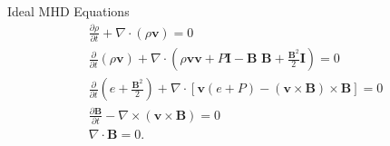 \documentclass[10pt,aspectratio=169,usenames,dvipsnames]{beamer}
\begin{document}
\begin{frame}{Ideal MHD Equations}
\footnotesize
\begin{gather}
\frac{\partial \rho}{\partial t} + \nabla \cdot (\rho \textbf{v}) = 0 \\
\frac{\partial}{\partial t} (\rho \textbf{v})+ \nabla \cdot \left( \rho \textbf{v} \textbf{v} + P \textbf{I} - \textbf{B B} + \frac{\textbf{B}^2}{2} \textbf{I} \right) = 0\\
\frac{\partial}{\partial t} \left( e + \frac{\textbf{B}^2}{2} \right) + \nabla \cdot \left[ \textbf{v} ( e + P) -  (\textbf{v} \times \textbf{B}) \times \textbf{B} \right]  =  0 \\
\frac{\partial \textbf{B}}{\partial t} - \nabla \times (\textbf{v} \times \textbf{B}) = 0 \\
\nabla \cdot \textbf{B} =0.
\end{gather}
\end{frame}
\end{document}
